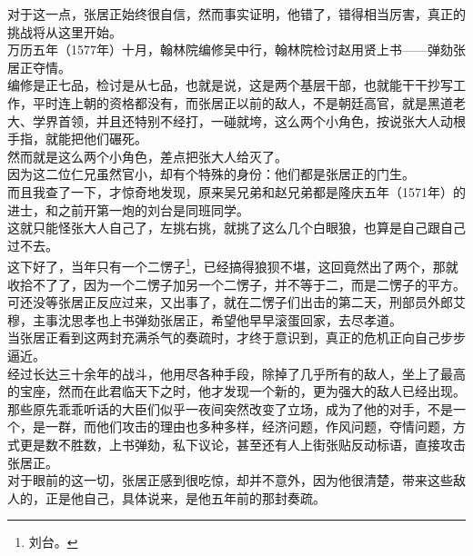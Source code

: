 \begin{multicols}{\theparacolNo}
对于这一点，张居正始终很自信，然而事实证明，他错了，错得相当厉害，真正的挑战将从这里开始。\\

万历五年（1577年）十月，翰林院编修吴中行，翰林院检讨赵用贤上书——弹劾张居正夺情。\\

编修是正七品，检讨是从七品，也就是说，这是两个基层干部，也就能干干抄写工作，平时连上朝的资格都没有，而张居正以前的敌人，不是朝廷高官，就是黑道老大、学界首领，并且还特别不经打，一碰就垮，这么两个小角色，按说张大人动根手指，就能把他们碾死。\\

然而就是这么两个小角色，差点把张大人给灭了。\\

因为这二位仁兄虽然官小，却有个特殊的身份：他们都是张居正的门生。\\

而且我查了一下，才惊奇地发现，原来吴兄弟和赵兄弟都是隆庆五年（1571年）的进士，和之前开第一炮的刘台是同班同学。\\

这就只能怪张大人自己了，左挑右挑，就挑了这么几个白眼狼，也算是自己跟自己过不去。\\

这下好了，当年只有一个二愣子\footnote{刘台。}，已经搞得狼狈不堪，这回竟然出了两个，那就收拾不了了，因为一个二愣子加另一个二愣子，并不等于二，而是二愣子的平方。\\

可还没等张居正反应过来，又出事了，就在二愣子们出击的第二天，刑部员外郎艾穆，主事沈思孝也上书弹劾张居正，希望他早早滚蛋回家，去尽孝道。\\

当张居正看到这两封充满杀气的奏疏时，才终于意识到，真正的危机正向自己步步逼近。\\

经过长达三十余年的战斗，他用尽各种手段，除掉了几乎所有的敌人，坐上了最高的宝座，然而在此君临天下之时，他才发现一个新的，更为强大的敌人已经出现。\\

那些原先乖乖听话的大臣们似乎一夜间突然改变了立场，成为了他的对手，不是一个，是一群，而他们攻击的理由也多种多样，经济问题，作风问题，夺情问题，方式更是数不胜数，上书弹劾，私下议论，甚至还有人上街张贴反动标语，直接攻击张居正。\\

对于眼前的这一切，张居正感到很吃惊，却并不意外，因为他很清楚，带来这些敌人的，正是他自己，具体说来，是他五年前的那封奏疏。\\


\end{multicols}
